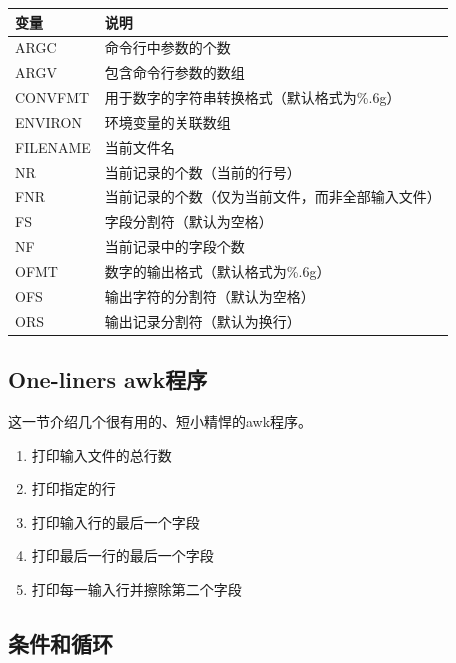 \begin{table}[hbtp]
  \begin{center}
    \begin{tabular}{ll}
      \hline
      变量     & 说明 \\
      \hline
      ARGC        & 命令行中参数的个数 \\
      \hline
      ARGV        & 包含命令行参数的数组 \\
      \hline
      CONVFMT     & 用于数字的字符串转换格式（默认格式为\%.6g） \\
      \hline
      ENVIRON     & 环境变量的关联数组 \\
      \hline
      FILENAME    & 当前文件名 \\
      \hline
      NR          & 当前记录的个数（当前的行号） \\
      \hline
      FNR         &  当前记录的个数（仅为当前文件，而非全部输入文件） \\
      \hline
      FS          & 字段分割符（默认为空格） \\
      \hline
      NF          & 当前记录中的字段个数 \\
      \hline 
      OFMT        & 数字的输出格式（默认格式为\%.6g） \\
      \hline
      OFS         & 输出字符的分割符（默认为空格） \\
      \hline
      ORS         & 输出记录分割符（默认为换行） \\
      \hline
    \end{tabular}
  \end{center}
\end{table}

\subsection{One-liners awk程序}

这一节介绍几个很有用的、短小精悍的awk程序。

\begin{enumerate}
\item 打印输入文件的总行数
\item 打印指定的行
\item 打印输入行的最后一个字段
\item 打印最后一行的最后一个字段
\item 打印每一输入行并擦除第二个字段
\end{enumerate}

\subsection{条件和循环}

